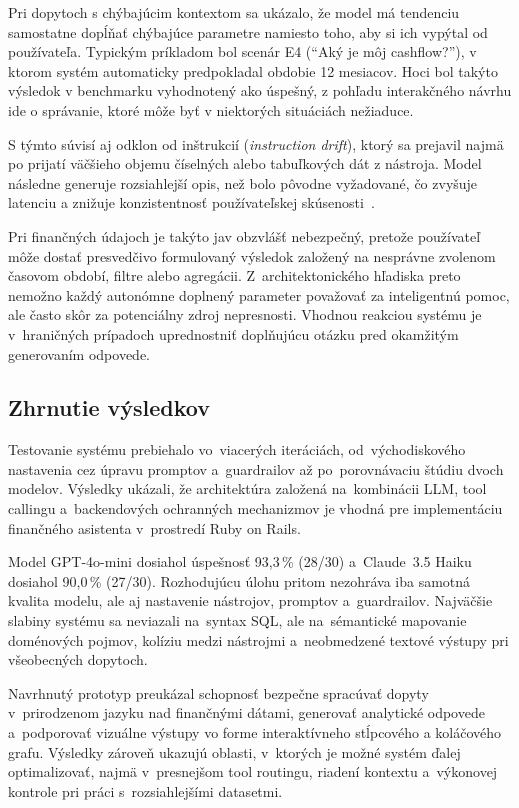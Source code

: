 Pri dopytoch s chýbajúcim kontextom sa ukázalo, že model má tendenciu samostatne
dopĺňať chýbajúce parametre namiesto toho, aby si ich vypýtal od používateľa.
Typickým príkladom bol scenár E4 (\enquote{Aký je môj cashflow?}), v ktorom
systém automaticky predpokladal obdobie 12 mesiacov. Hoci bol takýto výsledok v benchmarku
vyhodnotený ako úspešný, z pohľadu interakčného návrhu ide o správanie, ktoré môže
byť v niektorých situáciách nežiaduce.

S týmto súvisí aj odklon od inštrukcií (\textit{instruction drift}), ktorý sa prejavil
najmä po prijatí väčšieho objemu číselných alebo tabuľkových dát z nástroja.
Model následne generuje rozsiahlejší opis, než bolo pôvodne vyžadované, čo
zvyšuje latenciu a znižuje konzistentnosť používateľskej skúsenosti~\cite{rothman2024transformers}.

Pri finančných údajoch je takýto jav obzvlášť nebezpečný, pretože používateľ môže
dostať presvedčivo formulovaný výsledok založený na nesprávne zvolenom časovom období,
filtre alebo agregácii. Z~architektonického hľadiska preto nemožno každý autonómne
doplnený parameter považovať za inteligentnú pomoc, ale často skôr za
potenciálny zdroj nepresnosti. Vhodnou reakciou systému je v~hraničných prípadoch
uprednostniť doplňujúcu otázku pred okamžitým generovaním odpovede.

\subsection{Zhrnutie výsledkov}
Testovanie systému prebiehalo vo~viacerých iteráciách, od~východiskového
nastavenia cez úpravu promptov a~guardrailov až po~porovnávaciu štúdiu dvoch
modelov. Výsledky ukázali, že architektúra založená na~kombinácii LLM, tool callingu
a~backendových ochranných mechanizmov je vhodná pre implementáciu finančného asistenta
v~prostredí Ruby on Rails.

Model GPT-4o-mini dosiahol úspešnosť 93,3\,\% (28/30) a~Claude~3.5 Haiku dosiahol
90,0\,\% (27/30). Rozhodujúcu úlohu pritom nezohráva iba samotná kvalita modelu, ale
aj nastavenie nástrojov, promptov a~guardrailov. Najväčšie slabiny systému sa neviazali
na~syntax SQL, ale na~sémantické mapovanie doménových pojmov, kolíziu medzi nástrojmi
a~neobmedzené textové výstupy pri všeobecných dopytoch.

Navrhnutý prototyp preukázal schopnosť bezpečne spracúvať dopyty v~prirodzenom jazyku
nad finančnými dátami, generovať analytické odpovede a~podporovať vizuálne
výstupy vo forme interaktívneho stĺpcového a koláčového grafu. Výsledky zároveň ukazujú
oblasti, v~ktorých je možné systém ďalej optimalizovať, najmä v~presnejšom tool routingu,
riadení kontextu a~výkonovej kontrole pri práci s~rozsiahlejšími datasetmi.

